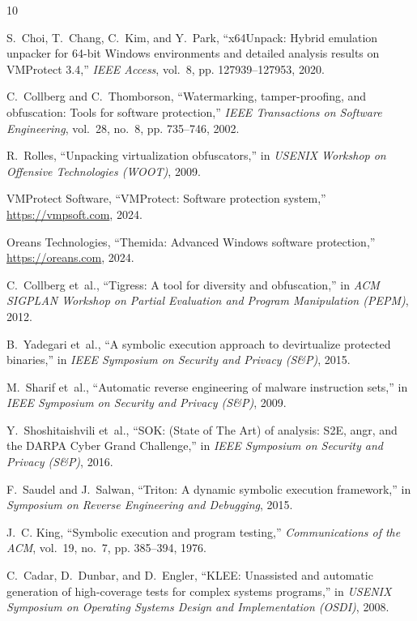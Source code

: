 \documentclass[11pt,a4paper]{article}
\begin{document}

\begin{thebibliography}{10}

S.~Choi, T.~Chang, C.~Kim, and Y.~Park, ``x64Unpack: Hybrid emulation unpacker for 64-bit Windows environments and detailed analysis results on VMProtect 3.4,'' \emph{IEEE Access}, vol.~8, pp. 127939--127953, 2020.

C.~Collberg and C.~Thomborson, ``Watermarking, tamper-proofing, and obfuscation: Tools for software protection,'' \emph{IEEE Transactions on Software Engineering}, vol.~28, no.~8, pp. 735--746, 2002.

R.~Rolles, ``Unpacking virtualization obfuscators,'' in \emph{USENIX Workshop on Offensive Technologies (WOOT)}, 2009.

VMProtect Software, ``VMProtect: Software protection system,'' \url{https://vmpsoft.com}, 2024.

Oreans Technologies, ``Themida: Advanced Windows software protection,'' \url{https://oreans.com}, 2024.

C.~Collberg et~al., ``Tigress: A tool for diversity and obfuscation,'' in \emph{ACM SIGPLAN Workshop on Partial Evaluation and Program Manipulation (PEPM)}, 2012.

B.~Yadegari et~al., ``A symbolic execution approach to devirtualize protected binaries,'' in \emph{IEEE Symposium on Security and Privacy (S\&P)}, 2015.

M.~Sharif et~al., ``Automatic reverse engineering of malware instruction sets,'' in \emph{IEEE Symposium on Security and Privacy (S\&P)}, 2009.

Y.~Shoshitaishvili et~al., ``SOK: (State of The Art) of analysis: S2E, angr, and the DARPA Cyber Grand Challenge,'' in \emph{IEEE Symposium on Security and Privacy (S\&P)}, 2016.

F.~Saudel and J.~Salwan, ``Triton: A dynamic symbolic execution framework,'' in \emph{Symposium on Reverse Engineering and Debugging}, 2015.

J.~C. King, ``Symbolic execution and program testing,'' \emph{Communications of the ACM}, vol.~19, no.~7, pp. 385--394, 1976.

C.~Cadar, D.~Dunbar, and D.~Engler, ``KLEE: Unassisted and automatic generation of high-coverage tests for complex systems programs,'' in \emph{USENIX Symposium on Operating Systems Design and Implementation (OSDI)}, 2008.


\end{thebibliography}
\end{document}
